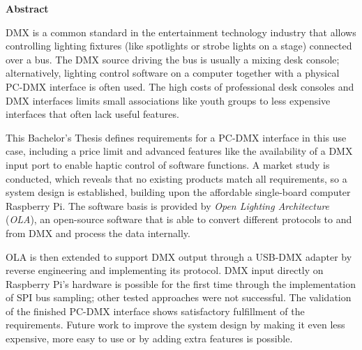 \vspace*{2cm}

\begin{center}
    \textbf{Abstract}
\end{center}

\vspace*{1cm}

\noindent DMX is a common standard in the entertainment technology industry that
allows controlling lighting fixtures (like spotlights or strobe lights
on a stage) connected over a bus. The DMX source driving the bus is
usually a mixing desk console; alternatively, lighting control software
on a computer together with a physical PC-DMX interface is often used.
The high costs of professional desk consoles and DMX interfaces limits
small associations like youth groups to less expensive interfaces that
often lack useful features.

This Bachelor's Thesis defines requirements for a PC-DMX interface in
this use case, including a price limit and advanced features like the
availability of a DMX input port to enable haptic control of software
functions. A market study is conducted, which reveals that no existing
products match all requirements, so a system design is established,
building upon the affordable single-board computer Raspberry Pi. The
software basis is provided by \emph{Open Lighting Architecture}
(\emph{OLA}), an open-source software that is able to convert different
protocols to and from DMX and process the data internally.

OLA is then extended to support DMX output through a USB-DMX adapter by
reverse engineering and implementing its protocol. DMX input directly on
Raspberry Pi's hardware is possible for the first time through the
implementation of SPI bus sampling; other tested approaches were not
successful. The validation of the finished PC-DMX interface shows
satisfactory fulfillment of the requirements. Future work to improve the
system design by making it even less expensive, more easy to use or by
adding extra features is possible.